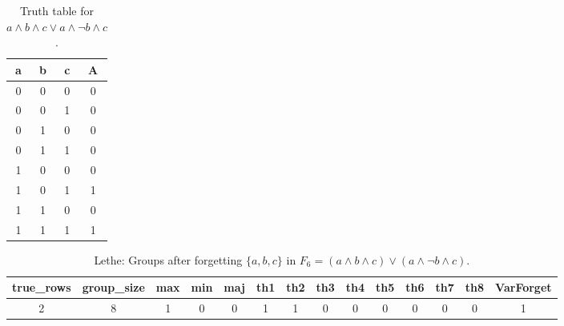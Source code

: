 \begin{table}[!tb]
    \centering
    \begin{tabular}{|c|c|c|c|}
        \hline
        \textbf{a} & \textbf{b} & \textbf{c} & \textbf{A} \\ \hline
        0 & 0 & 0 & 0 \\ \hline
        0 & 0 & 1 & 0 \\ \hline
        0 & 1 & 0 & 0 \\ \hline
        0 & 1 & 1 & 0 \\ \hline
        1 & 0 & 0 & 0 \\ \hline
        1 & 0 & 1 & 1 \\ \hline
        1 & 1 & 0 & 0 \\ \hline
        1 & 1 & 1 & 1 \\ \hline
    \end{tabular}
    \caption{Truth table for $a \land b \land c \lor a \land \lnot b \land c$.}
    \label{tab:truthtab}
\end{table}

\begin{table}[!tb]
    \centering
    \begin{tabular}{|c|c|c|c|c|c|c|c|c|c|c|c|c|c|}
        \hline
        \textbf{true\_rows} & \textbf{group\_size} & \textbf{max} & \textbf{min} & \textbf{maj} & \textbf{th1} & \textbf{th2} & \textbf{th3} & \textbf{th4} & \textbf{th5} & \textbf{th6} & \textbf{th7} & \textbf{th8} & \textbf{VarForget} \\ \hline
        \rowcolor{gray!40} 2 & 8 & 1 & 0 & 0 & 1 & 1 & 0 & 0 & 0 & 0 & 0 & 0 & 1 \\ \hline
    \end{tabular}
    \caption{Lethe: Groups after forgetting $\{a, b, c\}$ in $F_{6} = (a \land b \land c) \lor (a \land \lnot b \land c)$.}
    \label{tab:lethe-F6-abc-groups}
\end{table}
